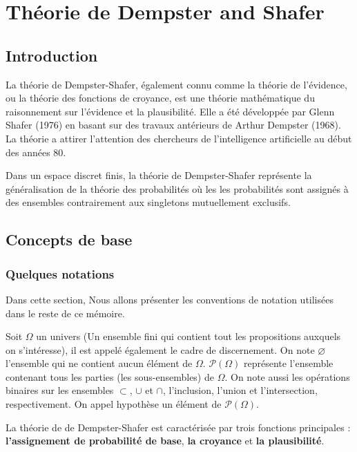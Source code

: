 \chapter{Théorie de Dempster and Shafer}

{}
\section*{Introduction}

La théorie de Dempster-Shafer, également connu comme la théorie de l'évidence,
ou la théorie des fonctions de croyance, est une théorie mathématique du raisonnement
sur l’évidence et la plausibilité. Elle a été développée par Glenn Shafer (1976)
en basant sur des travaux antérieurs de Arthur Dempster (1968). La théorie a attirer
l’attention des chercheurs de l'intelligence artificielle au début des années 80.

Dans un espace discret finis, la théorie de Dempster-Shafer représente la généralisation
de la théorie des probabilités où les les probabilités sont assignés à des ensembles
contrairement aux singletons mutuellement exclusifs.

\section{Concepts de base}

\subsection{Quelques notations}

Dans cette section, Nous allons présenter les conventions de notation utilisées dans le reste de ce mémoire.

Soit $\Omega$ un univers (Un ensemble fini qui contient tout les propositions auxquels on s'intéresse),
il est appelé également le cadre de discernement. On note $\varnothing$ l’ensemble qui
ne contient aucun élément de $\Omega$. $\mathcal{P}(\Omega)$ représente l’ensemble contenant tous
les parties (les sous-ensembles) de $\Omega$. On note aussi les opérations binaires
sur les ensembles $\subset$, $\cup$ et $\cap$, l’inclusion, l’union et l’intersection,
respectivement. On appel hypothèse un élément de $\mathcal{P}(\Omega)$.

La théorie de de Dempster-Shafer est caractérisée par trois fonctions principales : \textbf{l’assignement
de probabilité de base}, \textbf{la croyance} et \textbf{la plausibilité}.

